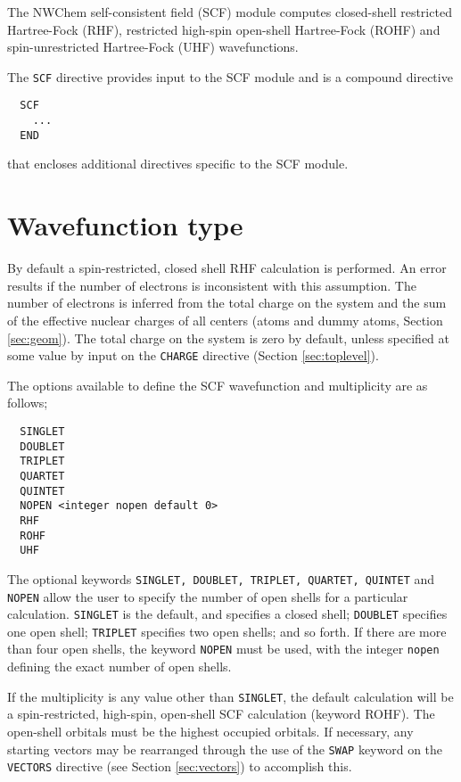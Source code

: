\label{sec:scf}

The NWChem self-consistent field (SCF) module computes closed-shell
restricted Hartree-Fock (RHF), restricted high-spin open-shell
Hartree-Fock (ROHF) and spin-unrestricted Hartree-Fock (UHF)
wavefunctions. 

The \verb+SCF+ directive provides input to the SCF module
and is a compound directive
\begin{verbatim}
  SCF
    ...
  END
\end{verbatim}
that encloses additional directives specific to the SCF module. 

\section{Wavefunction type}

By default a spin-restricted, closed shell RHF calculation is
performed.  An error results if the number of electrons is
inconsistent with this assumption.  The number of electrons is
inferred from the total charge on the system and the sum of the
effective nuclear charges of all centers (atoms and dummy atoms,
Section \ref{sec:geom}).  The total charge on the system is zero by
default, unless specified at some value by input on the \verb+CHARGE+
directive (Section \ref{sec:toplevel}).

The options available to define the SCF wavefunction and multiplicity
are as follows;

\begin{verbatim}
  SINGLET 
  DOUBLET 
  TRIPLET 
  QUARTET 
  QUINTET 
  NOPEN <integer nopen default 0>
  RHF
  ROHF
  UHF
\end{verbatim}

The optional keywords \verb+SINGLET, DOUBLET, TRIPLET, QUARTET, QUINTET+ 
and \verb+NOPEN+ allow the user to specify the number of open shells for a 
particular calculation.  \verb+SINGLET+ is the default, and specifies a 
closed shell; \verb+DOUBLET+ specifies one open shell; \verb+TRIPLET+
specifies two open shells; and so forth.  If there are more than four
open shells, the keyword \verb+NOPEN+ must be used, with the integer
\verb+nopen+ defining the exact number of open shells.

If the multiplicity is any value other than \verb+SINGLET+, the
default calculation will be a spin-restricted, high-spin, open-shell
SCF calculation (keyword ROHF).  The open-shell orbitals must be the
highest occupied orbitals.  If necessary, any starting vectors may be
rearranged through the use of the \verb+SWAP+ keyword on the
\verb+VECTORS+ directive (see Section \ref{sec:vectors}) to accomplish
this.


